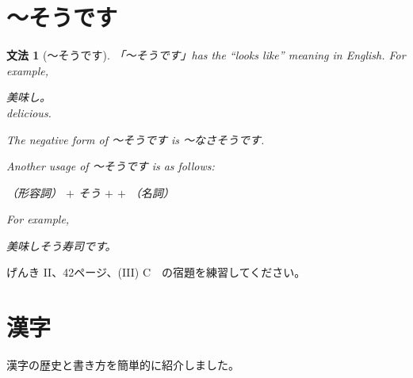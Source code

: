 \documentclass[notoc,notitlepage]{tufte-book}
\newtheorem{grammar}{文法}[section]
\begin{document}
\section{〜そうです}%
\label{sec:_soudesu}

\begin{grammar}[〜そうです]
\label{grammar:_soudesu}
  「〜そうです」has the ``looks like'' meaning in English. For example,
  \begin{center}
    美味し。 \\
     delicious.
  \end{center}
  The negative form of 〜そうです is 〜なさそうです.

  Another usage of 〜そうです is as follows:
  \begin{center}
    （形容詞） $+$ そう $+$  $+$ （名詞）
  \end{center}
  For example,
  \begin{center}
    美味しそう寿司です。
  \end{center}
\end{grammar}

\begin{ex}
  げんき II、42ページ、(III) C　の宿題を練習してください。
\end{ex}


\section{漢字}%
\label{sec:kanji}

漢字の歴史と書き方を簡単的に紹介しました。
\end{document}
